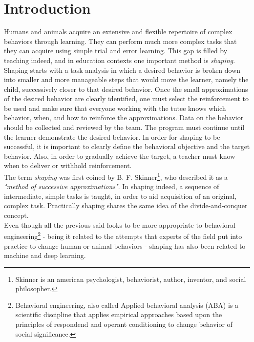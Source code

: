 \chapter{Introduction}
Humans and animals acquire an extensive and flexible repertoire of complex behaviors through learning. They can perform
much more complex tasks that they can acquire using simple trial and error learning. 
This gap is filled by teaching indeed, and in education contexts one important method is \textit{shaping}. Shaping starts with a task analysis in which a desired
behavior is broken down into smaller and more manageable steps that would move the learner, namely the child, successively closer to that desired behavior. Once the small approximations of the desired behavior are clearly
identified, one must select the reinforcement to be used and make sure that everyone working with the tutee knows which behavior, when, and how to reinforce the approximations.
Data on the behavior should be collected and reviewed by the team. The program must continue until the learner demonstrate the desired behavior.
In order for shaping to be successful, it is important to clearly define the behavioral objective and the target behavior. Also, in order to gradually achieve the target, 
a teacher must know when to deliver or withhold reinforcement. \\
The term \textit{shaping} was first coined 
by B. F. Skinner\footnote{Skinner is an american psychologist, behaviorist, author, inventor, and social philosopher.}, 
who described it as a \textsl{"method of successive approximations"}. In shaping indeed, a sequence of intermediate, simple tasks is taught, in order to aid acquisition of an original,
complex task. Practically shaping shares the same idea of the divide-and-conquer concept.\\
Even though all the previous said looks to be more appropriate
to behavioral engineering\footnote{Behavioral engineering, also called Applied behavioral analysis (ABA) is a scientific discipline that applies
empirical approaches based upon the principles of respondend and operant conditioning to change behavior of social significance.}
- being it related to the attempts that experts of the field put into practice to change human or animal behaviors - 
shaping has also been related to machine and deep learning.\\

